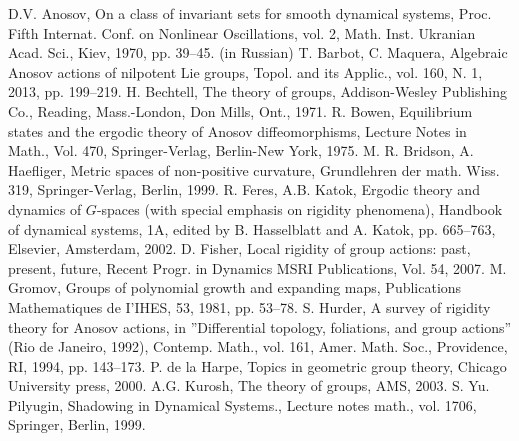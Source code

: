 \begin{thebibliography}{99}
 D.V. Anosov, On a class of invariant sets for smooth dynamical systems, Proc. Fifth Internat. Conf. on Nonlinear Oscillations, vol. 2, Math. Inst. Ukranian Acad. Sci., Kiev, 1970, pp. 39--45. (in Russian)
 T. Barbot, C. Maquera, Algebraic Anosov actions of nilpotent Lie groups,
Topol. and its Applic., vol. 160, N. 1, 2013, pp. 199--219.
     H. Bechtell, The theory of groups, Addison-Wesley Publishing Co., Reading, Mass.-London, Don Mills, Ont., 1971.
     R. Bowen, Equilibrium states and the ergodic theory of Anosov diffeomorphisms, Lecture Notes in Math., Vol. 470, Springer-Verlag, Berlin-New York, 1975.
     M. R. Bridson, A. Haefliger, Metric spaces of non-positive curvature, Grundlehren der math. Wiss. 319, Springer-Verlag, Berlin, 1999.
             R. Feres, A.B. Katok, Ergodic theory and dynamics of $G$-spaces (with special emphasis on rigidity phenomena), Handbook of dynamical systems, 1A, edited by B. Hasselblatt and A. Katok, pp. 665--763, Elsevier, Amsterdam, 2002. %
            D. Fisher, Local rigidity of group actions: past, present, future, Recent Progr. in Dynamics MSRI Publications, Vol. 54, 2007.
    M. Gromov, Groups of polynomial growth and expanding maps, Publications Mathematiques de I'IHES, 53, 1981, pp. 53--78.
 S. Hurder, A survey of rigidity theory for Anosov actions, in ''Differential topology, foliations, and group actions'' (Rio de Janeiro, 1992), Contemp. Math., vol. 161, Amer. Math. Soc., Providence, RI, 1994, pp. 143--173.
         P. de la Harpe, Topics in geometric group theory, Chicago University press, 2000.
     A.G. Kurosh, The theory of groups, AMS, 2003.
       S. Yu. Pilyugin, Shadowing in Dynamical Systems., Lecture notes math., vol. 1706, Springer, Berlin, 1999.

\end{thebibliography}
